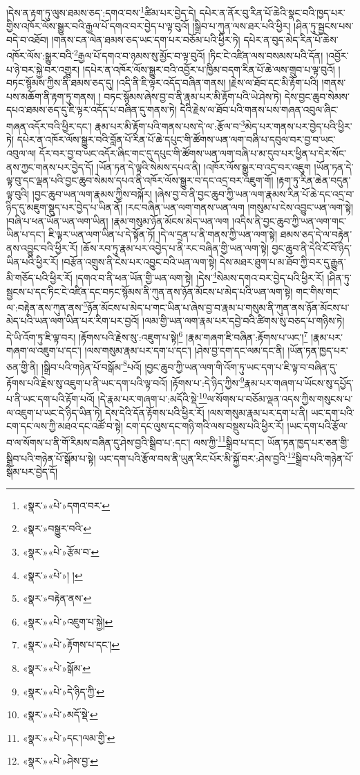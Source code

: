 །དེས་ན་རྟག་ཏུ་ལུས་ཐམས་ཅད་:དགའ་བས་\footnote{«སྣར་»«པེ་»དགའ་བར་}ཚིམ་པར་བྱེད་དེ། དཔེར་ན་ནོར་བུ་རིན་པོ་ཆེའི་སྣང་བའི་ཁྱད་པར་གྱིས་འཁོར་ལོས་སྒྱུར་བའི་རྒྱལ་པོ་དགའ་བར་བྱེད་པ་ལྟ་བུའོ། །སྒྲིབ་པ་ཀུན་ལས་ཐར་པའི་ཕྱིར། །ཤིན་ཏུ་སྦྱངས་པས་བདེ་བ་འཐོབ། །གནས་ངན་ལེན་ཐམས་ཅད་ཡང་དག་པར་བཅོམ་པའི་ཕྱིར་ཏེ། དཔེར་ན་བུད་མེད་རིན་པོ་ཆེས་འཁོར་ལོས་:སྒྱུར་བའི་\footnote{«སྣར་»བསྒྱུར་བའི་}རྒྱལ་པོ་དགའ་བ་ཉམས་སུ་མྱོང་བ་ལྟ་བུའོ། །ཏིང་ངེ་འཛིན་ལས་བསམས་པའི་དོན། །འབྱོར་པ་ཉེ་བར་སྐྱེ་བར་འགྱུར། །དཔེར་ན་འཁོར་ལོས་སྒྱུར་བའི་འབྱོར་པ་ཁྱིམ་བདག་རིན་པོ་ཆེ་ལས་གྲུབ་པ་ལྟ་བུའོ། །བཏང་སྙོམས་ཀྱིས་ནི་ཐམས་ཅད་དུ། །འདི་ནི་ཇི་ལྟར་འདོད་བཞིན་གནས། །རྗེས་ལ་ཐོབ་དང་མི་རྟོག་པའི། །གནས་པས་མཆོག་ནི་རྟག་ཏུ་གནས། །
བཏང་སྙོམས་ཞེས་བྱ་བ་ནི་རྣམ་པར་མི་རྟོག་པའི་ཡེ་ཤེས་ཏེ། དེས་བྱང་ཆུབ་སེམས་དཔའ་ཐམས་ཅད་དུ་ཇི་ལྟར་འདོད་པ་བཞིན་དུ་གནས་ཏེ། དེའི་རྗེས་ལ་ཐོབ་པའི་གནས་པས་གཞན་འབུལ་ཞིང་གཞན་འདོར་བའི་ཕྱིར་དང་། རྣམ་པར་མི་རྟོག་པའི་གནས་པས་དེ་ལ་:རྩོལ་བ་\footnote{«སྣར་»«པེ་»རྩོམ་བ་}མེད་པར་གནས་པར་བྱེད་པའི་ཕྱིར་ཏེ། དཔེར་ན་འཁོར་ལོས་སྒྱུར་བའི་བློན་པོ་རིན་པོ་ཆེ་དཔུང་གི་ཚོགས་ཡན་ལག་བཞི་པ་དབུལ་བར་བྱ་བ་ཡང་འབུལ་ལ། དོར་བར་བྱ་བ་ཡང་འདོར་ཞིང་གང་དུ་དཔུང་གི་ཚོགས་ཡན་ལག་བཞི་པ་མ་དུབ་པར་ཕྱིན་པ་དེར་སོང་ནས་ཀྱང་གནས་པར་བྱེད་དོ། །ཡོན་ཏན་དེ་ལྟའི་སེམས་དཔའ་ནི། །འཁོར་ལོས་སྒྱུར་བ་འདྲ་བར་འཇུག །ཡོན་ཏན་དེ་ལྟ་བུ་དང་ལྡན་པའི་བྱང་ཆུབ་སེམས་དཔའ་ནི་འཁོར་ལོས་སྒྱུར་བ་དང་འདྲ་བར་འཇུག་གོ། །རྟག་ཏུ་རིན་ཆེན་བདུན་ལྟ་བུའི། །བྱང་ཆུབ་ཡན་ལག་རྣམས་ཀྱིས་བསྐོར། །ཞེས་བྱ་བ་ནི་བྱང་ཆུབ་ཀྱི་ཡན་ལག་རྣམས་རིན་པོ་ཆེ་དང་འདྲ་བ་ཉིད་དུ་མཇུག་སྡུད་པར་བྱེད་པ་ཡིན་ནོ། །རང་བཞིན་ཡན་ལག་གནས་ཡན་ལག །གསུམ་པ་ངེས་འབྱུང་ཡན་ལག་སྟེ། །བཞི་པ་ཕན་ཡོན་ཡན་ལག་ཡིན། །རྣམ་གསུམ་ཉོན་མོངས་མེད་ཡན་ལག །འདིས་ནི་བྱང་ཆུབ་ཀྱི་ཡན་ལག་གང་ཡིན་པ་དང་། ཇི་ལྟར་ཡན་ལག་ཡིན་པ་དེ་སྟོན་ཏོ། །དེ་ལ་དྲན་པ་ནི་གནས་ཀྱི་ཡན་ལག་སྟེ། ཐམས་ཅད་དེ་ལ་བརྟེན་ནས་འབྱུང་བའི་ཕྱིར་རོ། །ཆོས་རབ་ཏུ་རྣམ་པར་འབྱེད་པ་ནི་རང་བཞིན་གྱི་ཡན་ལག་སྟེ། བྱང་ཆུབ་ནི་དེའི་ངོ་བོ་ཉིད་ཡིན་པའི་ཕྱིར་རོ། །བརྩོན་འགྲུས་ནི་ངེས་པར་འབྱུང་བའི་ཡན་ལག་སྟེ། དེས་མཐར་ཐུག་པ་མ་ཐོབ་ཀྱི་བར་དུ་རྒྱུན་མི་གཅོད་པའི་ཕྱིར་རོ། །དགའ་བ་ནི་ཕན་ཡོན་གྱི་ཡན་ལག་སྟེ། །དེས་\footnote{«སྣར་»«པེ་»། །}སེམས་དགའ་བར་བྱེད་པའི་ཕྱིར་རོ། །ཤིན་ཏུ་སྦྱངས་པ་དང་ཏིང་ངེ་འཛིན་དང་བཏང་སྙོམས་ནི་ཀུན་ནས་ཉོན་མོངས་པ་མེད་པའི་ཡན་ལག་སྟེ། གང་གིས་གང་ལ་:བརྟེན་ནས་ཀུན་ནས་\footnote{«སྣར་»བརྟེན་ནས་}ཉོན་མོངས་པ་མེད་པ་གང་ཡིན་པ་ཞེས་བྱ་བ་རྣམ་པ་གསུམ་ནི་ཀུན་ནས་ཉོན་མོངས་པ་མེད་པའི་ཡན་ལག་ཡིན་པར་རིག་པར་བྱའོ། །ལམ་གྱི་ཡན་ལག་རྣམ་པར་དབྱེ་བའི་ཚིགས་སུ་བཅད་པ་གཉིས་ཏེ། དེ་ཡི་འོག་ཏུ་ཇི་ལྟ་བར། །རྟོགས་པའི་རྗེས་སུ་:འཇུག་པ་སྟེ།\footnote{«སྣར་»«པེ་»འཇུག་པ་སྐྱེ།} །རྣམ་གཞག་ཇི་བཞིན་:རྟོགས་པ་ཡང་།\footnote{«སྣར་»«པེ་»རྟོགས་པ་དང་།} །རྣམ་པར་གཞག་ལ་འཇུག་པ་དང་། །ལས་གསུམ་རྣམ་པར་དག་པ་དང་། །ཤེས་བྱ་དག་དང་ལམ་དང་ནི། །ཡོན་ཏན་ཁྱད་པར་ཅན་གྱི་ནི། །སྒྲིབ་པའི་གཉེན་པོ་བསྒོམ་\footnote{«སྣར་»«པེ་»སྒོམ་}པའོ། །བྱང་ཆུབ་ཀྱི་ཡན་ལག་གི་འོག་ཏུ་ཡང་དག་པ་ཇི་ལྟ་བ་བཞིན་དུ་རྟོགས་པའི་རྗེས་སུ་འཇུག་པ་ནི་ཡང་དག་པའི་ལྟ་བའོ། །རྟོགས་པ་:དེ་ཉིད་ཀྱིས་\footnote{«སྣར་»«པེ་»དེ་ཉིད་ཀྱི་}རྣམ་པར་གཞག་པ་ཡོངས་སུ་དཔྱོད་པ་ནི་ཡང་དག་པའི་རྟོག་པའོ། །དེ་རྣམ་པར་གཞག་པ་:མདོའི་སྡེ་\footnote{«སྣར་»«པེ་»མདོ་སྡེ་}ལ་སོགས་པ་བཅོམ་ལྡན་འདས་ཀྱིས་གསུངས་པ་ལ་འཇུག་པ་ཡང་དེ་ཉིད་ཡིན་ཏེ། དེས་དེའི་དོན་རྟོགས་པའི་ཕྱིར་རོ། །ལས་གསུམ་རྣམ་པར་དག་པ་ནི། ཡང་དག་པའི་ངག་དང་ལས་ཀྱི་མཐའ་དང་འཚོ་བ་སྟེ། ངག་དང་ལུས་དང་གཉི་གའི་ལས་བསྡུས་པའི་ཕྱིར་རོ། །ཡང་དག་པའི་རྩོལ་བ་ལ་སོགས་པ་ནི་གོ་རིམས་བཞིན་དུ་ཤེས་བྱའི་སྒྲིབ་པ་:དང་། ལས་ཀྱི་\footnote{«སྣར་»«པེ་»དང་།ལམ་གྱི་}སྒྲིབ་པ་དང་། ཡོན་ཏན་ཁྱད་པར་ཅན་གྱི་སྒྲིབ་པའི་གཉེན་པོ་སྒོམ་པ་སྟེ། ཡང་དག་པའི་རྩོལ་བས་ནི་ཡུན་རིང་པོར་མི་སྐྱོ་བར་:ཤེས་བྱའི་\footnote{«སྣར་»«པེ་»ཤེས་བྱ་}སྒྲིབ་པའི་གཉེན་པོ་སྒོམ་པར་བྱེད་དོ། 